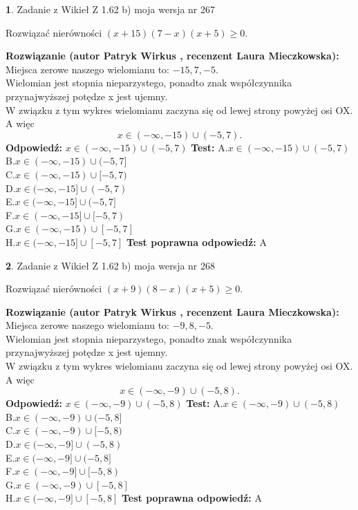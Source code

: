 \documentclass[12pt, a4paper]{article}
\theoremstyle{definition} %
\newtheorem{zad}{}
\newcommand{\zadStart}[1]{\begin{zad}#1\newline}
\newcommand{\zadStop}{\end{zad}}
\newcommand{\rozwStart}[2]{\noindent \textbf{Rozwiązanie (autor #1 , recenzent #2): }\newline}
\newcommand{\rozwStop}{\newline}
\newcommand{\odpStart}{\noindent \textbf{Odpowiedź:}\newline}
\newcommand{\odpStop}{\newline}
\newcommand{\testStart}{\noindent \textbf{Test:}\newline}
\newcommand{\testStop}{\newline}
\newcommand{\kluczStart}{\noindent \textbf{Test poprawna odpowiedź:}\newline}
\newcommand{\kluczStop}{\newline}
\begin{document}
\zadStart{Zadanie z Wikieł Z 1.62 b) moja wersja nr 267}

Rozwiązać nierówności $(x+15)(7-x)(x+5)\ge0$.
\zadStop
\rozwStart{Patryk Wirkus}{Laura Mieczkowska}
Miejsca zerowe naszego wielomianu to: $-15, 7, -5$.\\
Wielomian jest stopnia nieparzystego, ponadto znak współczynnika przy\linebreak najwyższej potędze x jest ujemny.\\ W związku z tym wykres wielomianu zaczyna się od lewej strony powyżej osi OX. A więc $$x \in (-\infty,-15) \cup (-5,7).$$
\rozwStop
\odpStart
$x \in (-\infty,-15) \cup (-5,7)$
\odpStop
\testStart
A.$x \in (-\infty,-15) \cup (-5,7)$\\
B.$x \in (-\infty,-15) \cup (-5,7]$\\
C.$x \in (-\infty,-15) \cup [-5,7)$\\
D.$x \in (-\infty,-15] \cup (-5,7)$\\
E.$x \in (-\infty,-15] \cup (-5,7]$\\
F.$x \in (-\infty,-15] \cup [-5,7)$\\
G.$x \in (-\infty,-15) \cup [-5,7]$\\
H.$x \in (-\infty,-15] \cup [-5,7]$
\testStop
\kluczStart
A
\kluczStop



\zadStart{Zadanie z Wikieł Z 1.62 b) moja wersja nr 268}

Rozwiązać nierówności $(x+9)(8-x)(x+5)\ge0$.
\zadStop
\rozwStart{Patryk Wirkus}{Laura Mieczkowska}
Miejsca zerowe naszego wielomianu to: $-9, 8, -5$.\\
Wielomian jest stopnia nieparzystego, ponadto znak współczynnika przy\linebreak najwyższej potędze x jest ujemny.\\ W związku z tym wykres wielomianu zaczyna się od lewej strony powyżej osi OX. A więc $$x \in (-\infty,-9) \cup (-5,8).$$
\rozwStop
\odpStart
$x \in (-\infty,-9) \cup (-5,8)$
\odpStop
\testStart
A.$x \in (-\infty,-9) \cup (-5,8)$\\
B.$x \in (-\infty,-9) \cup (-5,8]$\\
C.$x \in (-\infty,-9) \cup [-5,8)$\\
D.$x \in (-\infty,-9] \cup (-5,8)$\\
E.$x \in (-\infty,-9] \cup (-5,8]$\\
F.$x \in (-\infty,-9] \cup [-5,8)$\\
G.$x \in (-\infty,-9) \cup [-5,8]$\\
H.$x \in (-\infty,-9] \cup [-5,8]$
\testStop
\kluczStart
A
\kluczStop
\end{document}
